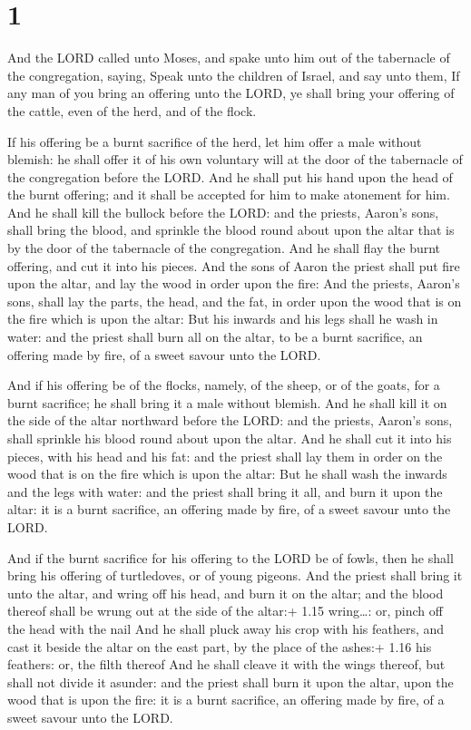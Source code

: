 \hypertarget{section}{%
\section{1}\label{section}}

 And the LORD called unto Moses, and spake unto him out of
the tabernacle of the congregation, saying,  Speak unto the
children of Israel, and say unto them, If any man of you bring an
offering unto the LORD, ye shall bring your offering of the cattle, even
of the herd, and of the flock.

 If his offering be a burnt sacrifice of the herd, let him
offer a male without blemish: he shall offer it of his own voluntary
will at the door of the tabernacle of the congregation before the LORD.
 And he shall put his hand upon the head of the burnt
offering; and it shall be accepted for him to make atonement for him.
 And he shall kill the bullock before the LORD: and the
priests, Aaron's sons, shall bring the blood, and sprinkle the blood
round about upon the altar that is by the door of the tabernacle of the
congregation.  And he shall flay the burnt offering, and cut
it into his pieces.  And the sons of Aaron the priest shall
put fire upon the altar, and lay the wood in order upon the fire:
 And the priests, Aaron's sons, shall lay the parts, the
head, and the fat, in order upon the wood that is on the fire which is
upon the altar:  But his inwards and his legs shall he wash
in water: and the priest shall burn all on the altar, to be a burnt
sacrifice, an offering made by fire, of a sweet savour unto the LORD.

 And if his offering be of the flocks, namely, of the
sheep, or of the goats, for a burnt sacrifice; he shall bring it a male
without blemish.  And he shall kill it on the side of the
altar northward before the LORD: and the priests, Aaron's sons, shall
sprinkle his blood round about upon the altar.  And he
shall cut it into his pieces, with his head and his fat: and the priest
shall lay them in order on the wood that is on the fire which is upon
the altar:  But he shall wash the inwards and the legs with
water: and the priest shall bring it all, and burn it upon the altar: it
is a burnt sacrifice, an offering made by fire, of a sweet savour unto
the LORD.

 And if the burnt sacrifice for his offering to the LORD
be of fowls, then he shall bring his offering of turtledoves, or of
young pigeons.  And the priest shall bring it unto the
altar, and wring off his head, and burn it on the altar; and the blood
thereof shall be wrung out at the side of the altar:+ 1.15 wring\ldots:
or, pinch off the head with the nail  And he shall pluck
away his crop with his feathers, and cast it beside the altar on the
east part, by the place of the ashes:+ 1.16 his feathers: or, the filth
thereof  And he shall cleave it with the wings thereof, but
shall not divide it asunder: and the priest shall burn it upon the
altar, upon the wood that is upon the fire: it is a burnt sacrifice, an
offering made by fire, of a sweet savour unto the LORD.


